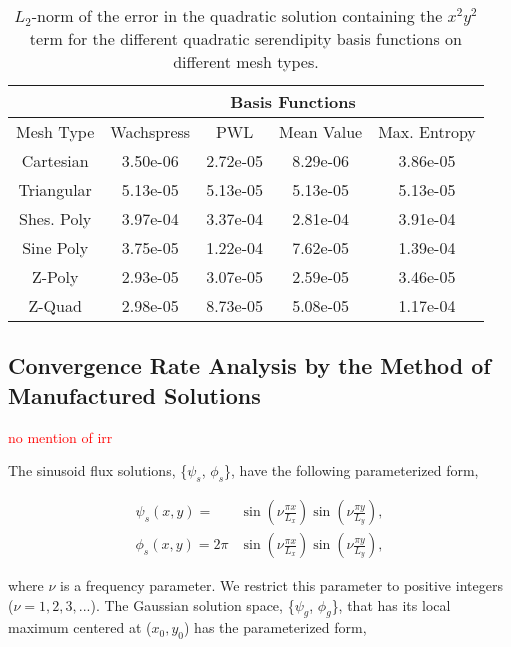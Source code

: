 \documentclass[preprint,10pt]{elsarticle}
\newcommand{\tcr}[1]{\textcolor{red}{#1}}
\begin{document}
%
\begin{table}[hbt]
\caption{$L_2$-norm of the error in the quadratic solution containing the $x^2y^2$ term for the different quadratic serendipity basis functions on different mesh types.}
\centering
\def\arraystretch{1.25}
\begin{tabular}{|c|c|c|c|c|}
\hline
& \multicolumn{4}{c}{Basis Functions}\vline\\
\hline
Mesh Type & Wachspress & PWL& Mean Value& Max. Entropy \\
\hline
Cartesian&3.50e-06&2.72e-05&8.29e-06&3.86e-05\\
Triangular&5.13e-05&5.13e-05&5.13e-05&5.13e-05\\
Shes. Poly&3.97e-04&3.37e-04&2.81e-04&3.91e-04\\
Sine Poly&3.75e-05&1.22e-04&7.62e-05&1.39e-04\\
Z-Poly&2.93e-05&3.07e-05&2.59e-05&3.46e-05\\
Z-Quad&2.98e-05&8.73e-05&5.08e-05&1.17e-04\\
\hline
\end{tabular}
\end{table}

\subsection{Convergence Rate Analysis by the Method of Manufactured Solutions}
\tcr{no mention of irr}

The sinusoid flux solutions, \{$\psi_s$, $\phi_s$\}, have the following parameterized form,

\begin{equation}
\label{eq::Results_MMS_sinefluxsols}
\begin{aligned}
\psi_s (x,y) = &\sin(\nu  \frac{\pi x}{L_x}) \sin(\nu  \frac{\pi y}{L_y}), \\ 
\phi_s (x,y) = 2 \pi &\sin(\nu  \frac{\pi x}{L_x}) \sin(\nu  \frac{\pi y}{L_y}),
\end{aligned} 
\end{equation}

\noindent where $\nu$ is a frequency parameter. We restrict this parameter to positive integers ($\nu = 1,2,3,...$). The Gaussian solution space, \{$\psi_g$, $\phi_g$\}, that has its local maximum centered at ($x_0,y_0$) has the parameterized form,
\end{document}
